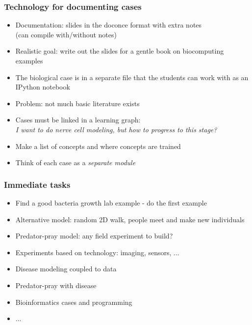 \documentclass{beamer}
\newcounter{doconce:movie:counter}
\begin{document}
\begin{frame}
\frametitle{Technology for documenting cases}

\begin{block}{}
\begin{itemize}
 \item Documentation: slides in the doconce format with extra notes\\
   (can compile with/without notes)

 \item Realistic goal: write out the slides for a gentle book on biocomputing examples

 \item The biological case is in a separate file that the students can work
   with as an IPython notebook

 \item Problem: not much basic literature exists

 \item Cases must be linked in a learning graph:\\
   \emph{I want to do nerve cell modeling, but how to progress to this stage?}

 \item Make a list of concepts and where concepts are trained

 \item Think of each case as a \emph{separate module}
\end{itemize}

\noindent
\end{block}
\end{frame}

\begin{frame}
\frametitle{Immediate tasks}

\begin{block}{}
\begin{itemize}
 \item Find a good bacteria growth lab example - do the first example

 \item Alternative model: random 2D walk, people meet and make new individuals

 \item Predator-pray model: any field experiment to build?

 \item Experiments based on technology: imaging, sensors, ...

 \item Disease modeling coupled to data

 \item Predator-pray with disease

 \item Bioinformatics cases and programming

 \item ...
\end{itemize}

\noindent
\end{block}
\end{frame}
\end{document}
